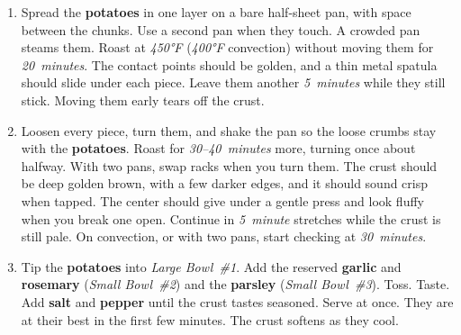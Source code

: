 \documentclass[11pt,letterpaper]{article}
\begin{document}
\begin{enumerate}
    \item Spread the \textbf{potatoes} in one layer on a bare half-sheet pan, with space between the chunks. Use a second pan when they touch. A crowded pan steams them. Roast at \textit{450°F} (\textit{400°F} convection) without moving them for \textit{20~minutes}. The contact points should be golden, and a thin metal spatula should slide under each piece. Leave them another \textit{5~minutes} while they still stick. Moving them early tears off the crust.

    \item Loosen every piece, turn them, and shake the pan so the loose crumbs stay with the \textbf{potatoes}. Roast for \textit{30--40~minutes} more, turning once about halfway. With two pans, swap racks when you turn them. The crust should be deep golden brown, with a few darker edges, and it should sound crisp when tapped. The center should give under a gentle press and look fluffy when you break one open. Continue in \textit{5~minute} stretches while the crust is still pale. On convection, or with two pans, start checking at \textit{30~minutes}.

    \item Tip the \textbf{potatoes} into \textit{Large Bowl~\#1}. Add the reserved \textbf{garlic} and \textbf{rosemary} (\textit{Small Bowl~\#2}) and the \textbf{parsley} (\textit{Small Bowl~\#3}). Toss. Taste. Add \textbf{salt} and \textbf{pepper} until the crust tastes seasoned. Serve at once. They are at their best in the first few minutes. The crust softens as they cool.
\end{enumerate}

\newpage
\end{document}
